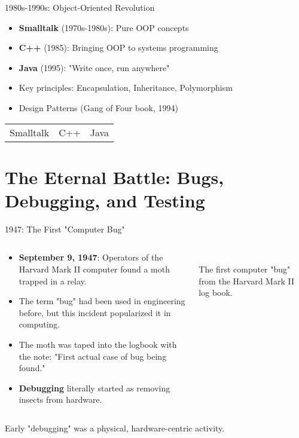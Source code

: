 \documentclass{beamer}
\begin{document}
\begin{frame}{1980s-1990s: Object-Oriented Revolution}
\begin{itemize}
    \item \textbf{Smalltalk} (1970s-1980s): Pure OOP concepts
    \item \textbf{C++} (1985): Bringing OOP to systems programming
    \item \textbf{Java} (1995): "Write once, run anywhere"
    \item Key principles: Encapsulation, Inheritance, Polymorphism
    \item Design Patterns (Gang of Four book, 1994)
\end{itemize}
\begin{center}
    \begin{tabular}{ccc}
        Smalltalk & C++ & Java
    \end{tabular}
\end{center}
\end{frame}

\section{The Eternal Battle: Bugs, Debugging, and Testing}

\begin{frame}{1947: The First "Computer Bug"}
\begin{columns}
    \begin{column}{0.5\textwidth}
        \begin{itemize}
            \item \textbf{September 9, 1947}: Operators of the Harvard Mark II computer found a moth trapped in a relay.
            \item The term "bug" had been used in engineering before, but this incident popularized it in computing.
            \item The moth was taped into the logbook with the note: "First actual case of bug being found."
            \item \textbf{Debugging} literally started as removing insects from hardware.
        \end{itemize}
    \end{column}
    \begin{column}{0.5\textwidth}
        \\\scriptsize{The first computer "bug" from the Harvard Mark II log book.}
    \end{column}
\end{columns}
\begin{block}{}
Early "debugging" was a physical, hardware-centric activity.
\end{block}
\end{frame}
\end{document}
